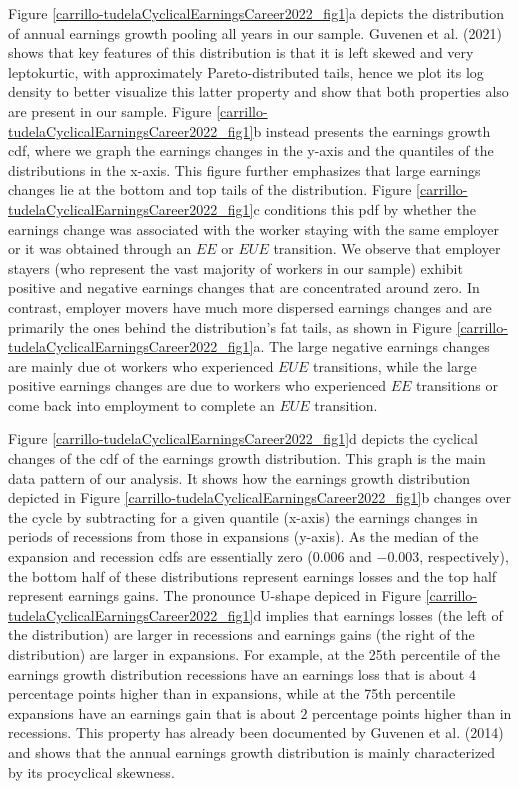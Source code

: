 \documentclass[12pt]{article}
\theoremstyle{definition}
\begin{document}
Figure \ref{carrillo-tudelaCyclicalEarningsCareer2022_fig1}a depicts the distribution of annual earnings growth pooling all years in our sample. Guvenen et al. (2021) shows that key features of this distribution is that it is left skewed and very leptokurtic, with approximately Pareto-distributed tails, hence we plot its log density to better visualize this latter property and show that both properties also are present in our sample. Figure \ref{carrillo-tudelaCyclicalEarningsCareer2022_fig1}b instead presents the earnings growth cdf, where we graph the earnings changes in the y-axis and the quantiles of the distributions in the x-axis. This figure further emphasizes that large earnings changes lie at the bottom and top tails of the distribution. Figure \ref{carrillo-tudelaCyclicalEarningsCareer2022_fig1}c conditions this pdf by whether the earnings change was associated with the worker staying with the same employer or it was obtained through an $EE$ or $EUE$ transition. We observe that employer stayers (who represent the vast majority of workers in our sample) exhibit positive and negative earnings changes that are concentrated around zero. In contrast, employer movers have much more dispersed earnings changes and are primarily the ones behind the distribution's fat tails, as shown in Figure \ref{carrillo-tudelaCyclicalEarningsCareer2022_fig1}a. The large negative earnings changes are mainly due ot workers who experienced $EUE$ transitions, while the large positive earnings changes are due to workers who experienced $EE$ transitions or come back into employment to complete an $EUE$ transition. 

Figure \ref{carrillo-tudelaCyclicalEarningsCareer2022_fig1}d depicts the cyclical changes of the cdf of the earnings growth distribution. This graph is the main data pattern of our analysis. It shows how the earnings growth distribution depicted in Figure \ref{carrillo-tudelaCyclicalEarningsCareer2022_fig1}b changes over the cycle by subtracting for a given quantile (x-axis) the earnings changes in periods of recessions from those in expansions (y-axis). As the median of the expansion and recession cdfs are essentially zero ($0.006$ and $-0.003$, respectively), the bottom half of these distributions represent earnings losses and the top half represent earnings gains. The pronounce U-shape depiced in Figure \ref{carrillo-tudelaCyclicalEarningsCareer2022_fig1}d implies that earnings losses (the left of the distribution) are larger in recessions and earnings gains (the right of the distribution) are larger in expansions. For example, at the 25th percentile of the earnings growth distribution recessions have an earnings loss that is about $4$ percentage points higher than in expansions, while at the 75th percentile expansions have an earnings gain that is about $2$ percentage points higher than in recessions. This property has already been documented by Guvenen et al. (2014) and shows that the annual earnings growth distribution is mainly characterized by its procyclical skewness.
\end{document}
